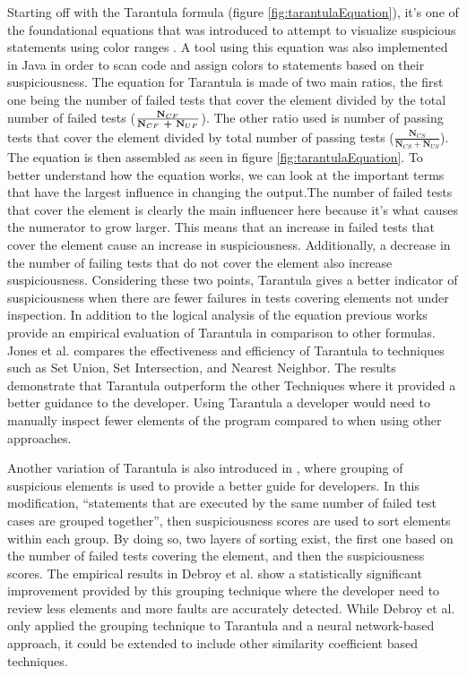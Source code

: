 Starting off with the Tarantula formula (figure \ref{fig:tarantulaEquation}), it's
one of the foundational equations that was introduced to attempt to visualize
suspicious statements using color ranges \cite{jones2002viz,
Jones2005TarantulaEval}. A tool using this equation was also implemented in Java
in order to scan code and assign colors to statements based on their
suspiciousness. The equation for Tarantula is made of two main ratios, the first
one being the number of failed tests that cover the element divided by the total
number of failed tests (\(\frac{\textbf{N$_{CF}$}}{\textbf{N$_{CF}$ +
\textbf{N$_{UF}$}}}\)). The other ratio used is number of passing tests that
cover the element divided by total number of passing tests
(\(\frac{\textbf{N$_{CS}$}}{\textbf{N$_{CS}$}+\textbf{N$_{US}$}}\)).
The equation is then assembled as seen in figure \ref{fig:tarantulaEquation}.
To better understand how the equation works, we can look at the important terms
that have the largest influence in changing the output.The number of failed
tests that cover the element is clearly the main influencer here because it's
what causes the numerator to grow larger. This means that an increase in failed
tests that cover the element cause an increase in suspiciousness. Additionally,
a decrease in the number of failing tests that do not cover the element also
increase suspiciousness. Considering these two points, Tarantula gives a better
indicator of suspiciousness when there are fewer failures in tests covering
elements not under inspection. In addition to the logical analysis of the
equation previous works provide an empirical evaluation of Tarantula in
comparison to other formulas. Jones et al. \cite{Jones2005TarantulaEval}
compares the effectiveness and efficiency of Tarantula to techniques such as Set Union, Set
Intersection, and Nearest Neighbor. The results demonstrate that Tarantula
outperform the other Techniques where it provided a better guidance to the
developer. Using Tarantula a developer would need to manually
inspect fewer elements of the program compared to when using other approaches.

Another variation of Tarantula is also introduced in \cite{debroy2010grouping},
where grouping of suspicious elements is used to provide a better guide for
developers. In this modification, ``statements that are executed by the same
number of failed test cases are grouped together'', then suspiciousness scores
are used to sort elements within each group. By doing so, two layers of sorting
exist, the first one based on the number of failed tests covering the element,
and then the suspiciousness scores. The empirical results in Debroy et al.
\cite{debroy2010grouping} show a statistically significant improvement provided
by this grouping technique where the developer need to review less elements and
more faults are accurately detected. While Debroy et al. only applied the
grouping technique to Tarantula and a neural network-based approach, it could be
extended to include other similarity coefficient based techniques.

